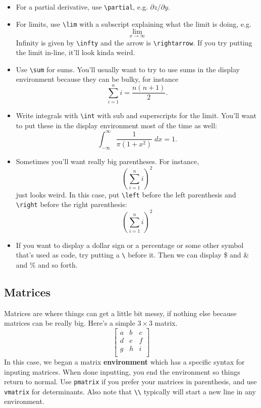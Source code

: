 \documentclass[12pt]{article}
\begin{document}
\begin{itemize}
		\item For a partial derivative, use \verb|\partial|, e.g. $\partial z/\partial y$. 
		
		\item For limits, use \verb|\lim| with a subscript explaining what the limit is 
		doing, e.g.
				\[ \lim_{x \rightarrow \infty}  \]
		Infinity is given by \verb|\infty| and  the arrow is \verb|\rightarrow|. If you 
		try putting the limit in-line, it'll look kinda weird. 
		
		\item Use \verb|\sum| for sums. You'll usually want to try to use sums in the 
		display environment because they can be bulky, for instance
			\[\sum_{i=1}^n i = \frac{n(n+1)}{2}.\]
			
		\item Write integrals with \verb|\int| with sub and superscripts for the limit. 
		You'll want to put these in the display environment most of the time as well:
			\[ \int_{-\infty}^{\infty} \frac{1}{\pi(1+x^2)} \; dx = 1 .\]
			
		\item Sometimes you'll want really big parentheses. For instance,
				\[ ( \sum_{i=1}^n i)^2	\]
			just looks weird. In this case, put \verb|\left| before the left parenthesis 
			and \verb|\right| before the right parenthesis:
				\[ \left( \sum_{i=1}^n i \right)^2	\]
				
		\item If you want to display a dollar sign or a percentage or some other symbol 
		that's used as code, try putting a \verb|\| before it. Then we can display \$ and 
		\& and \% and so forth.
	\end{itemize}
	
	
\subsection{Matrices}

Matrices are where things can get a little bit messy, if nothing else because matrices can be 
really big. Here's a simple $3 \times 3$ matrix. 
\[
	\begin{bmatrix}
		a	&	b	&	c	\\
		d	&	e	&	f	\\
		g	&	h	&	i	\\
	\end{bmatrix}
\]
In this case, we began a matrix \textbf{environment} which has a specific syntax for inputing
matrices. When done inputting, you end the environment so things return to normal. Use 
\verb|pmatrix| if you prefer your matrices in parenthesis, and use \verb|vmatrix| for 
determinants. Also note that \verb|\\| typically will start a new line in any environment.
\end{document}
